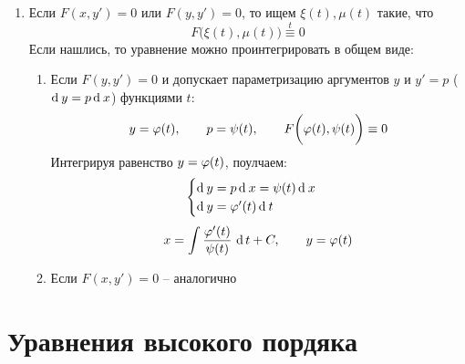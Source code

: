 \begin{enumerate}
\begin{enumerate}
\begin{multicols}{2}
            \columnbreak \\
            Надо проверить, будет ли функция $ y(x) = C $ при каких-либо $ C $ решением
        \end{multicols}
    \end{enumerate}
    \item Если $ F(x, y') = 0 $ или $ F(y, y') = 0 $, то ищем $ \xi(t), \mu(t) $ такие, что
    $$ F \bigg( \xi(t), \mu(t) \bigg) \overset{t}\equiv 0 $$
    Если нашлись, то уравнение можно проинтегрировать в общем виде:
    \begin{enumerate}
    	\item Если $ F(y, y') = 0 $ и допускает параметризацию аргументов $ y $ и $ y' = p $ ($ \di y = p\di x $) функциями $ t $:
        $$ y = \vphi(t), \qquad p = \psi(t), \qquad F \bigg( \vphi(t), \psi(t) \bigg) \equiv 0 $$
        Интегрируя равенство $ y = \vphi(t) $, поулчаем:
        $$
        \begin{cases}
            \di y = p\di x = \psi(t)\di x \\
            \di y = \vphi'(t)\di t
        \end{cases} $$
        $$ x = \uint[t]{\frac{\vphi'(t)}{\psi(t)}} + C, \qquad y = \vphi(t) $$
        \item Если $ F(x, y') = 0 $ -- аналогично
    \end{enumerate}
\end{enumerate}

\section{Уравнения высокого пордяка}

